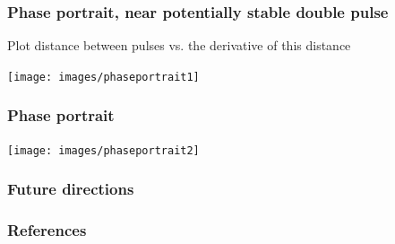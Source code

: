 \documentclass[16pt]{beamer}
\begin{document}
\begin{frame}
	\frametitle{Phase portrait, near potentially stable double pulse}
	Plot distance between pulses vs. the derivative of this distance
	\begin{center}
	\texttt{[image: images/phaseportrait1]}
	\end{center}
\end{frame}

\begin{frame}
	\frametitle{Phase portrait}
	\begin{center}
	\texttt{[image: images/phaseportrait2]}
	\end{center}
\end{frame}

\begin{frame}
	\frametitle{Future directions}

\end{frame}

\begin{frame}
	\frametitle{References}
\end{frame}
 
\end{document}

